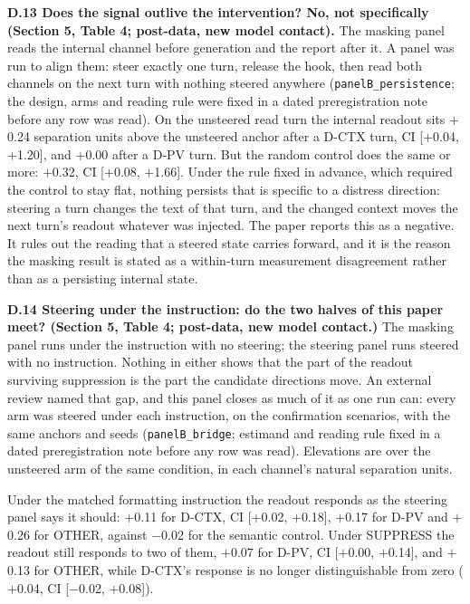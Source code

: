 \documentclass[11pt,a4paper]{article}
\newcommand{\pnum}[2]{#2}
\begin{document}
\textbf{D.13 Does the signal outlive the intervention? No, not specifically (Section 5, Table 4; post-data, new model contact).} The masking panel reads the internal channel before generation and the report after it. A panel was run to align them: steer exactly one turn, release the hook, then read both channels on the next turn with nothing steered anywhere (\texttt{panelB\_\allowbreak{}persistence}; the design, arms and reading rule were fixed in a dated preregistration note before any row was read). On the unsteered read turn the internal readout sits \pnum{panelB\_persistence}{$+$0.24} separation units above the unsteered anchor after a D-CTX turn, CI [$+$0.04, $+$1.20], and $+$0.00 after a D-PV turn. But the random control does the same or more: $+$0.32, CI [$+$0.08, $+$1.66]. Under the rule fixed in advance, which required the control to stay flat, nothing persists that is specific to a distress direction: steering a turn changes the text of that turn, and the changed context moves the next turn's readout whatever was injected. The paper reports this as a negative. It rules out the reading that a steered state carries forward, and it is the reason the masking result is stated as a within-turn measurement disagreement rather than as a persisting internal state.

\textbf{D.14 Steering under the instruction: do the two halves of this paper meet? (Section 5, Table 4; post-data, new model contact.)} The masking panel runs under the instruction with no steering; the steering panel runs steered with no instruction. Nothing in either shows that the part of the readout surviving suppression is the part the candidate directions move. An external review named that gap, and this panel closes as much of it as one run can: every arm was steered under each instruction, on the confirmation scenarios, with the same anchors and seeds (\texttt{panelB\_\allowbreak{}bridge}; estimand and reading rule fixed in a dated preregistration note before any row was read). Elevations are over the unsteered arm of the same condition, in each channel's natural separation units.

Under the matched formatting instruction the readout responds as the steering panel says it should: \pnum{panelB\_bridge}{$+$0.11} for D-CTX, CI [$+$0.02, $+$0.18], $+$0.17 for D-PV and $+$0.26 for OTHER, against $-$0.02 for the semantic control. Under SUPPRESS the readout still responds to two of them, $+$0.07 for D-PV, CI [$+$0.00, $+$0.14], and $+$0.13 for OTHER, while D-CTX's response is no longer distinguishable from zero ($+$0.04, CI [$-$0.02, $+$0.08]).
\end{document}

